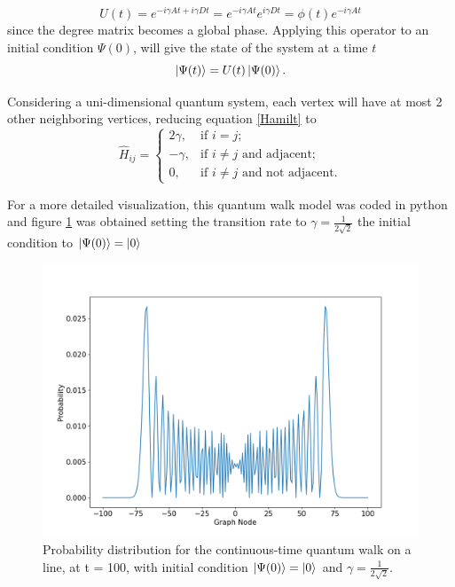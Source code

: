 \documentclass[../../dissertation.tex]{subfiles}
\begin{document}
\begin{equation}
	U(t) = e^{-i\gamma A t + i\gamma D t} = e^{-i\gamma A t} e^{i\gamma D t} = \phi(t) e^{-i\gamma A t} 
\end{equation}
since the degree matrix becomes a global phase.
Applying this operator to an initial condition $\Psi(0)$, will give the state of the system at a time $t$
\begin{equation}
	\ket{\Psi(t)} = U(t)\ket{\Psi(0)}.
\end{equation}\par
Considering a uni-dimensional quantum system, each vertex will have at most 2 other neighboring vertices, reducing equation \ref{Hamilt} to
\begin{equation}
	\hat{H}_{ij} = \begin{cases} 
		2\gamma, & \mbox{if } i= j; \\ 
		-\gamma, & \mbox{if } i\neq j\mbox{ and adjacent};\\
		0, & \mbox{if } i\neq j\mbox{ and not adjacent}.
	\end{cases}
\end{equation}\par
For a more detailed visualization, this quantum walk model was coded in python and figure \ref{fig:contdist0} was obtained setting the transition rate to $\gamma=\frac{1}{2\sqrt{2}}$ the initial condition to $\ket{\Psi(0)} = \ket{0}$ 

\begin{figure}[!h]
	\centering
	\includegraphics[scale=0.40]{img/ContQuantumWalk/ctqwSinglePsi0.png}
	\caption{Probability distribution for the continuous-time quantum walk on a line, at t = 100, with initial condition $\ket{\Psi(0)}=\ket{0}$ and $\gamma=\frac{1}{2\sqrt{2}}$.} 
	\label{fig:contdist0}
\end{figure}
\end{document}
